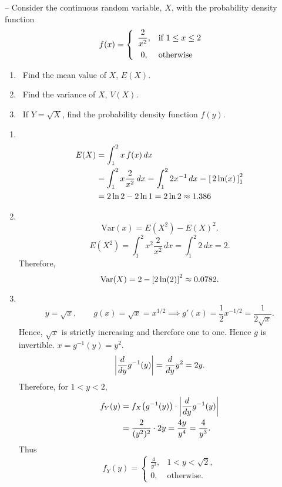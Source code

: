 \documentclass[11pt,paper=a4,abstract=on,parskip=half,DIV=calc,compact]{scrartcl}
\let\originalleft\left
\let\originalright\right
\renewcommand{\left}{\mathopen{}\mathclose\bgroup\originalleft}
\renewcommand{\right}{\aftergroup\egroup\originalright}
\begin{document}
\begin{ExerciseList}
\begin{enumerate}
\end{enumerate}



 --
{Consider the continuous random variable, $X$, with the
probability density function
$$
f(x) = \left\{ \begin{array}{cl} \displaystyle \frac{2}{x^2}, & \mbox{if}~ 1 \leq x \leq 2   \\[2ex]
0, & \mbox{otherwise}
\end{array} \right.$$
}
\begin{enumerate}
\item
~{Find the mean value of $X$, $E(X)$.}
\item
~{Find the variance of $X$, $V(X)$.}
\item
~{If $Y = \sqrt{X}$, find the probability density function $f(y)$.
}
\end{enumerate}

\Answer
\begin{enumerate}
\item
~{
\begin{align*}
E(X) &= \int_1^2 x \, f(x) \, dx \\
&= \int_1^2 x \frac{2}{x^2} \, dx = \int_1^2 2x^{-1}\, dx = \left[ \, 2 \ln(x) \, \right]_1^2 \\
&= 2 \ln 2 - 2 \ln 1 = 2 \ln 2 \approx 1.386
\end{align*}
}
\item
~{
$$ \text{Var}(x) = E(X^2) - E(X)^2.
$$
$$
E(X^2) = \int_1^2 x^2 \frac{2}{x^2} \, dx = \int_1^2 2 \, dx = 2.
$$
Therefore,
$$ \text{Var}(X) = 2 - \left[ 2 \ln (2) \right]^2 \approx 0.0782.
$$
}
\item
~{
$$ y=\sqrt{x}, \qquad g(x) = \sqrt{x} = x^{1/2} \implies g'(x) = \frac{1}{2} x^{-1/2} = \frac{1}{2 \sqrt{x}}.$$
Hence, $\sqrt{x}$ is strictly increasing and therefore one to one. Hence $g$ is invertible. $ x =  g^{-1}(y) = y^2$.
$$ \left| \frac{d}{dy} g^{-1}(y) \right| = \frac{d}{dy} y^2 = 2y. $$
Therefore, for $1 <y < 2$,
\begin{align*}
f_Y(y) &= f_X \left( g^{-1}(y)\right) \cdot \left| \frac{d}{dy} g^{-1}(y) \right| \\
&= \frac{2}{(y^2)^2} \cdot 2y = \frac{4y}{y^4} = \frac{4}{y^3}.
\end{align*}
Thus
$$
f_Y(y) = \begin{cases} \frac{4}{y^3}, & 1 < y < \sqrt{2},\\
0, & \text{otherwise}.
\end{cases}
$$
}
\end{enumerate}


\end{ExerciseList}
\end{document}
